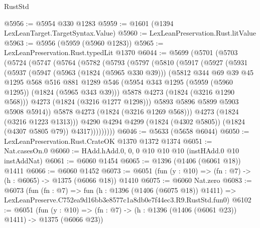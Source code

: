 \begin{lexlean}{RustStd}
\begin{coremodule}
@5956 := @5954 @330 @1283
@5959 := @1601 (@1394 LexLeanTarget.TargetSyntax.Value)
@5960 := LexLeanPreservation.Rust.litValue
@5963 := @5956 (@5959 (@5960 @1283))
@5965 := LexLeanPreservation.Rust.typedLit @1370
@6044 := @5699
    (@5701
      (@5703
        (@5724
          (@5747
            (@5764
              (@5782
                (@5793
                  (@5797
                    (@5810
                      (@5917
                        (@5927
                          (@5931
                            (@5937
                              (@5947
                                (@5963 (@1824 (@5965 @330 @39)))
                                (@5812
                                  @344
                                  @69
                                  @39
                                  @45
                                  @1295
                                  @568
                                  @516
                                  @881
                                  @1289
                                  @546
                                  (@5954 @343 @1295 (@5959 (@5960 @1295)) (@1824 (@5965 @343 @39)))
                                  @5878
                                  @4273
                                  (@1824 (@3216 @1290 @568)))
                                @4273
                                (@1824 (@3216 @1277 @1298)))
                              @5893
                              @5896
                              @5899
                              @5903
                              @5908
                              @5914))
                          @5878
                          @4273
                          (@1824 (@3216 @1269 @568)))
                        @4273
                        (@1824 (@3216 @1223 @1313)))
                      @4290
                      @4294
                      @4299
                      (@1824 (@4302 @5805))
                      (@1824 (@4307 @5805 @79))
                      @4317)))))))))
@6046 := @5633 (@5658 @6044)
@6050 := LexLeanPreservation.Rust.CrateOK @1370 @1372 @1374
@6051 := Nat.casesOn.{0}
@6060 := HAdd.hAdd.{0, 0, 0} @10 @10 @10 (instHAdd.{0} @10 instAddNat)
@6061 := @6060 @1454
@6065 := @1396 (@1406 (@6061 @18)) @1411
@6066 := @6060 @1452
@6073 := @6051 (fun (y : @10) => (fn : @7) -> (h : @6065) -> @1375 (@6066 @18)) @1410
@6075 := @6060 Nat.zero
@6083 := @6073
    (fun (fn : @7) =>
    fun (h : @1396 (@1406 (@6075 @18)) @1411) =>
    LexLeanPreserve.C752ea9d16bb3e8577c1a8db0e7f44ec3.R9.RustStd.fun0)
@6102 := @6051
    (fun (y : @10) => (fn : @7) -> (h : @1396 (@1406 (@6061 @23)) @1411) -> @1375 (@6066 @23))

\end{coremodule}
\end{lexlean}

